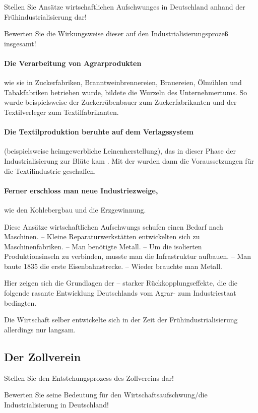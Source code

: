 \begin{aufgabe}
Stellen Sie Ansätze wirtschaftlichen Aufschwunges in Deutschland
anhand der Frühindustrialisierung dar!

Bewerten Sie die Wirkungsweise dieser auf den
Industrialisierungsprozeß insgesamt!
\end{aufgabe}

\paragraph{Die Verarbeitung von Agrarprodukten} wie sie in
Zuckerfabriken, Branntweinbrennereien, Brauereien, Ölmühlen und
Tabakfabriken betrieben wurde, bildete die Wurzeln des
Unternehmertums. So wurde beispielsweise der Zuckerrübenbauer zum
Zuckerfabrikanten und der Textilverleger zum Textilfabrikanten.

\paragraph{Die Textilproduktion beruhte auf dem Verlagssystem}
(beispielsweise heimgewerbliche Leinenherstellung), das in dieser
Phase der Industrialisierung zur Blüte kam
\cite[207]{gelbesGeschichts}.  Mit der  wurden dann die Voraussetzungen für die
Textilindustrie geschaffen.

\paragraph{Ferner erschloss man neue Industriezweige,} wie den
Kohlebergbau und die Erzgewinnung.

Diese Ansätze wirtschaftlichen Aufschwungs schufen einen Bedarf nach
Maschinen. -- Kleine Reparaturwerkstätten entwickelten sich zu
Maschinenfabriken. -- Man benötigte Metall. -- Um die isolierten
Produktionsinseln zu verbinden, musste man die Infrastruktur aufbauen.
-- Man baute 1835 die erste Eisenbahnstrecke. -- Wieder brauchte man
Metall.

Hier zeigen sich die Grundlagen der  -- starker
Rückkopplungseffekte, die die folgende rasante Entwicklung
Deutschlands vom Agrar- zum Industriestaat bedingten.

Die Wirtschaft selber entwickelte sich in der Zeit der
Frühindustrialisierung allerdings nur langsam.


\subsection{Der Zollverein}

\begin{aufgabe}
Stellen Sie den Entstehungsprozess des Zollvereins dar!

Bewerten Sie seine Bedeutung für den Wirtschaftsaufschwung/die
Industrialisierung in Deutschland!
\end{aufgabe}

\endinput
